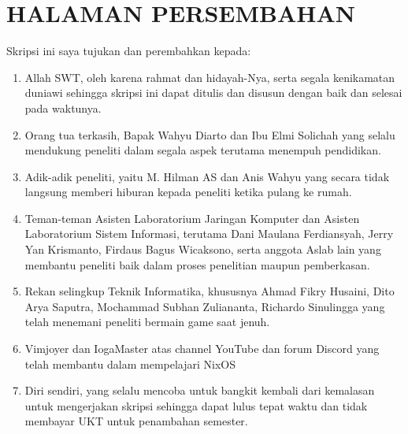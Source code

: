 \documentclass[10pt,]{report}
\begin{document}
\chapter*{HALAMAN PERSEMBAHAN}
\begin{adjustwidth}{0pt}{}
	Skripsi ini saya tujukan dan perembahkan kepada:
	\begin{enumerate}
		\item Allah SWT, oleh karena rahmat dan hidayah-Nya, serta segala
		      kenikamatan duniawi sehingga skripsi ini dapat ditulis dan disusun dengan
		      baik dan selesai pada waktunya.
		\item Orang tua terkasih, Bapak Wahyu Diarto dan Ibu Elmi Solichah yang
		      selalu mendukung peneliti dalam segala aspek terutama menempuh
		      pendidikan.
		\item Adik-adik peneliti, yaitu M. Hilman AS dan Anis Wahyu yang secara
		      tidak langsung memberi hiburan kepada peneliti ketika pulang ke rumah.
		\item Teman-teman Asisten Laboratorium Jaringan Komputer dan Asisten
		      Laboratorium Sistem Informasi, terutama Dani Maulana Ferdiansyah, Jerry
		      Yan Krismanto, Firdaus Bagus Wicaksono, serta anggota Aslab lain yang
		      membantu peneliti baik dalam proses penelitian maupun pemberkasan.
		\item Rekan selingkup Teknik Informatika, khususnya Ahmad Fikry Husaini,
		      Dito Arya Saputra, Mochammad Subhan Zuliananta, Richardo Sinulingga yang
		      telah menemani peneliti bermain game saat jenuh.
		\item Vimjoyer dan IogaMaster atas channel YouTube dan forum Discord yang
		      telah membantu dalam mempelajari NixOS
		\item Diri sendiri, yang selalu mencoba untuk bangkit kembali dari
		      kemalasan untuk mengerjakan skripsi sehingga dapat lulus tepat waktu dan
		      tidak membayar UKT untuk penambahan semester.
	\end{enumerate}
\end{adjustwidth}
\end{document}

